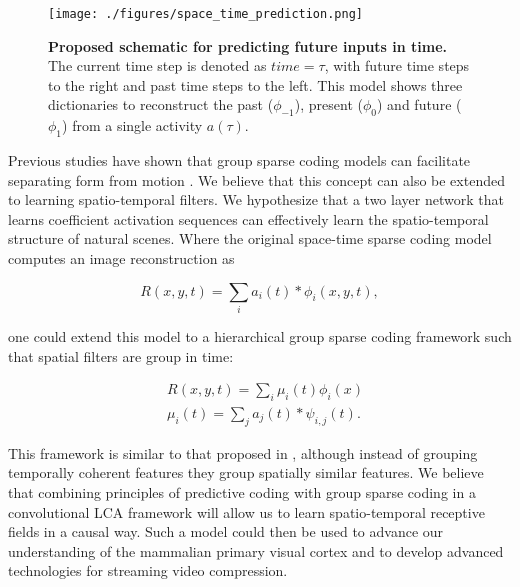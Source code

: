 \documentclass[smallextended]{svjour3}       %
\begin{document}
\begin{figure}
\centering
    \texttt{[image: ./figures/space\_time\_prediction.png]}
    \caption{\textbf{Proposed schematic for predicting future inputs in time.} The current time step is denoted as $time=\tau$, with future time steps to the right and past time steps to the left. This model shows three dictionaries to reconstruct the past ($\phi_{-1}$), present ($\phi_{0}$) and future ($\phi_{1}$) from a single activity $a(\tau)$.}
\label{predictionmodel}
\end{figure}

\noindent Previous studies have shown that group sparse coding models can facilitate separating form from motion \cite{cadieu2008learning}. We believe that this concept can also be extended to learning spatio-temporal filters. We hypothesize that a two layer network that learns coefficient activation sequences can effectively learn the spatio-temporal structure of natural scenes. Where the original space-time sparse coding model computes an image reconstruction as

\begin{displaymath}
    R(x,y,t) = \sum_{i}a_i(t) \ast \phi_{i}(x,y,t),
\end{displaymath}

\noindent one could extend this model to a hierarchical group sparse coding framework such that spatial filters are group in time:

\begin{equation}
\begin{align}
    &R(x,y,t) = \sum_{i}\mu_{i}(t)\phi_{i}(x)\\
    &\mu_{i}(t) = \sum_{j}a_{j}(t) \ast \psi_{i,j}(t).
\end{align}
\label{groupspacetime}
\end{equation}

\noindent This framework is similar to that proposed in \cite{le2013building,garrigues2010group}, although instead of grouping temporally coherent features they group spatially similar features. We believe that combining principles of predictive coding with group sparse coding in a convolutional LCA framework will allow us to learn spatio-temporal receptive fields in a causal way. Such a model could then be used to advance our understanding of the mammalian primary visual cortex and to develop advanced technologies for streaming video compression.


\end{document}
